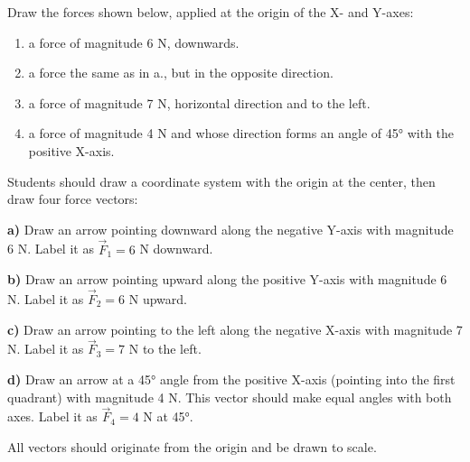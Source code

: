 \begin{exercise}
    Draw the forces shown below, applied at the origin of the X- and Y-axes:
    \begin{enumerate}[label=\letraminuscula]
        \item a force of magnitude 6 N, downwards.
        \item a force the same as in a., but in the opposite direction.
        \item a force of magnitude 7 N, horizontal direction and to the left.
        \item a force of magnitude 4 N and whose direction forms an angle of 45° with the positive X-axis.
    \end{enumerate}


    \begin{solu}
        Students should draw a coordinate system with the origin at the center, then draw four force vectors:

        \textbf{a)} Draw an arrow pointing downward along the negative Y-axis with magnitude 6 N. Label it as $\vec{F}_1 = 6$ N downward.

        \textbf{b)} Draw an arrow pointing upward along the positive Y-axis with magnitude 6 N. Label it as $\vec{F}_2 = 6$ N upward.

        \textbf{c)} Draw an arrow pointing to the left along the negative X-axis with magnitude 7 N. Label it as $\vec{F}_3 = 7$ N to the left.

        \textbf{d)} Draw an arrow at a 45° angle from the positive X-axis (pointing into the first quadrant) with magnitude 4 N. This vector should make equal angles with both axes. Label it as $\vec{F}_4 = 4$ N at 45°.

        All vectors should originate from the origin and be drawn to scale.
    \end{solu}
\end{exercise}


